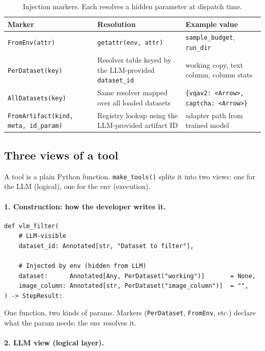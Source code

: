 \begin{table}[H]
\centering
\caption{Injection markers. Each resolves a hidden parameter at dispatch time.}
\label{tab:markers}
\begin{tabular}{lp{5cm}l}
\toprule
\textbf{Marker} & \textbf{Resolution} & \textbf{Example value} \\
\midrule
\texttt{FromEnv(attr)} & \texttt{getattr(env, attr)} & \texttt{sample\_budget}, \texttt{run\_dir} \\
\texttt{PerDataset(key)} & Resolver table keyed by the LLM-provided \texttt{dataset\_id} & working copy, text column, column stats \\
\texttt{AllDatasets(key)} & Same resolver mapped over all loaded datasets & \texttt{\{vqav2: <Arrow>, captcha: <Arrow>\}} \\
\texttt{FromArtifact(kind, meta, id\_param)} & Registry lookup using the LLM-provided artifact ID & adapter path from trained model \\
\bottomrule
\end{tabular}
\end{table}

\subsection{Three views of a tool}

A tool is a plain Python function.
\texttt{make\_tools()} splits it into two views: one for the LLM (logical), one for the env (execution).

\paragraph{1. Construction: how the developer writes it.}

\begin{verbatim}
def vlm_filter(
    # LLM-visible
    dataset_id: Annotated[str, "Dataset to filter"],

    # Injected by env (hidden from LLM)
    dataset:      Annotated[Any, PerDataset("working")]       = None,
    image_column: Annotated[str, PerDataset("image_column")]  = "",
) -> StepResult:
\end{verbatim}

\noindent One function, two kinds of params. Markers (\texttt{PerDataset}, \texttt{FromEnv}, etc.) declare what the param needs; the env resolves it.

\paragraph{2. LLM view (logical layer).}

